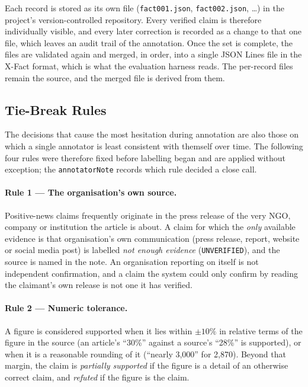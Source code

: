 Each record is stored as its own file (\texttt{fact001.json},
\texttt{fact002.json}, \ldots) in the project's version-controlled
repository. Every verified claim is therefore individually visible,
and every later correction is recorded as a change to that one file,
which leaves an audit trail of the annotation. Once the set is
complete, the files are validated again and merged, in order, into a
single JSON Lines file in the X-Fact format, which is what the
evaluation harness reads. The per-record files remain the source, and
the merged file is derived from them.

\subsection{Tie-Break Rules}
\label{subsec:custom-rules}

The decisions that cause the most hesitation during annotation are
also those on which a single annotator is least consistent with
themself over time. The following four rules were therefore fixed
before labelling began and are applied without exception; the
\texttt{annotatorNote} records which rule decided a close call.

\paragraph{Rule 1 --- The organisation's own source.}
Positive-news claims frequently originate in the press release of
the very NGO, company or institution the article is about. A claim
for which the \emph{only} available evidence is that organisation's
own communication (press release, report, website or social media
post) is labelled \emph{not enough evidence}
(\texttt{UNVERIFIED}), and the source is named in the note. An
organisation reporting on itself is not independent confirmation,
and a claim the system could only confirm by reading the claimant's
own release is not one it has verified.

\paragraph{Rule 2 --- Numeric tolerance.}
A figure is considered supported when it lies within $\pm10\%$ in
relative terms of the figure in the source (an article's ``30\%''
against a source's ``28\%'' is supported), or when it is a reasonable
rounding of it (``nearly 3,000'' for 2,870). Beyond that margin, the
claim is \emph{partially supported} if the figure is a detail of an
otherwise correct claim, and \emph{refuted} if the figure is the
claim.

